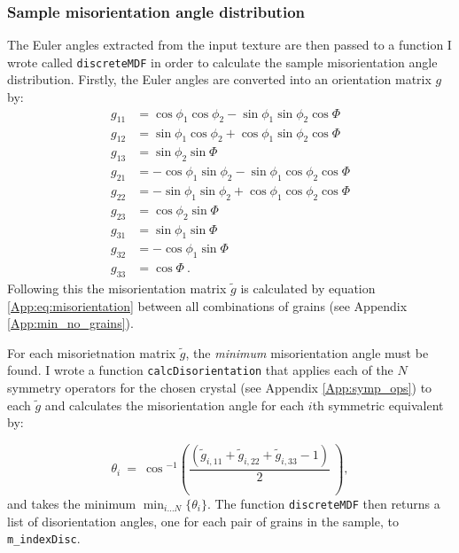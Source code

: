 \documentclass[a4paper,12pt,twoside]{report}
\numberwithin{equation}{chapter}
\begin{document}
\subsubsection{Sample misorientation angle distribution} 
The Euler angles extracted from the input texture are then passed to a function I wrote called \texttt{discreteMDF} in order to calculate the sample misorientation angle distribution. Firstly, the Euler angles are converted into an orientation matrix $g$ by:    
\begin{equation}
\begin{split}
g_{11} &= \cos{\phi_1}\cos{\phi_2} - \sin{\phi_1}\sin{\phi_2}\cos{\Phi} \\
g_{12} &= \sin{\phi_1}\cos{\phi_2} + \cos{\phi_1}\sin{\phi_2}\cos{\Phi} \\
g_{13} &= \sin{\phi_2}\sin{\Phi} \\
g_{21} &= -\cos{\phi_1}\sin{\phi_2} - \sin{\phi_1}\cos{\phi_2}\cos{\Phi} \\
g_{22} &= -\sin{\phi_1}\sin{\phi_2} + \cos{\phi_1}\cos{\phi_2}\cos{\Phi} \\
g_{23} &= \cos{\phi_2}\sin{\Phi} \\
g_{31} &= \sin{\phi_1}\sin{\Phi} \\
g_{32} &= -\cos{\phi_1}\sin{\Phi} \\
g_{33} &= \cos{\Phi}\ .
\end{split}
\end{equation}
\noindent
Following this the misorientation matrix $\tilde{g}$ is calculated by equation \ref{App:eq:misorientation} between all combinations of grains (see Appendix \ref{App:min_no_grains}).

For each misorietnation matrix $\tilde{g}$, the \emph{minimum} misorientation \citep[disorientation,][]{Grimmer1979} angle must be found. I wrote a function \texttt{calcDisorientation} that applies each of the $N$ symmetry operators for the chosen crystal (see Appendix \ref{App:symp_ops}) to each $\tilde{g}$ and calculates the misorientation angle for each $i$th symmetric equivalent by:   

\begin{equation}
\theta_i\ =\ \cos{}^{-1} \left( \frac{(\tilde{g}_{i,11} + \tilde{g}_{i,22} + \tilde{g}_{i,33} - 1)}{2}\ \right) ,
\end{equation}
\noindent
and takes the minimum $\displaystyle \min_{i...N}\{\theta_i\}$. The function \texttt{discreteMDF} then returns a list of disorientation angles, one for each pair of grains in the sample, to \texttt{m\_indexDisc}. 
\end{document}
